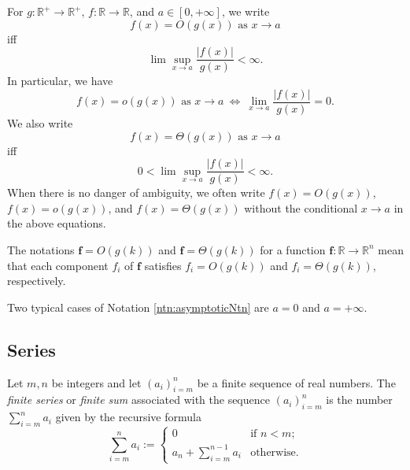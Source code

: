 \begin{ntn}
  \label{ntn:asymptoticNtn}
  For $g:\mathbb{R}^+\rightarrow\mathbb{R}^+$, 
  $f:\mathbb{R} \rightarrow\mathbb{R}$, 
  and $a\in [0,+\infty]$, 
  we write
  \begin{displaymath}
    f(x) = O(g(x)) \text{ as } x\to a %
  \end{displaymath}
  iff %
  \begin{displaymath}
    \lim\sup_{x\rightarrow a} \frac{|f(x)|}{g(x)} < \infty.
  \end{displaymath}
  In particular, we have
  \begin{displaymath}
    f(x) = o(g(x)) \text{ as } x\to a
    \ \Leftrightarrow\
    \lim_{x\rightarrow a} \frac{|f(x)|}{g(x)} = 0.
  \end{displaymath}
  We also write
  \begin{displaymath}
    f(x)=\Theta(g(x)) \text{ as } x\to a %
  \end{displaymath}
  iff
  \begin{displaymath}
    0< \lim\sup_{x\rightarrow a} \frac{|f(x)|}{g(x)} < \infty.
  \end{displaymath}
  When there is no danger of ambiguity,
  we often write $f(x)=O(g(x))$,
  $f(x)=o(g(x))$, and $f(x)=\Theta(g(x))$
  without the conditional $x \rightarrow a$
  in the above equations.

  The notations $\mathbf{f}=O(g(k))$ and $\mathbf{f}=\Theta(g(k))$
  for a function $\mathbf{f}:\mathbb{R} \rightarrow\mathbb{R}^n$
  mean that each component $f_i$ of $\mathbf{f}$
  satisfies ${f}_i=O(g(k))$ and ${f}_i=\Theta(g(k))$,
  respectively.
\end{ntn}

\begin{rem}
  Two typical cases of Notation \ref{ntn:asymptoticNtn}
  are $a=0$ and $a=+\infty$.
\end{rem}


\subsection{Series}
\label{sec:series}

\begin{defn}
  Let $m,n$ be integers
  and let $(a_i)_{i=m}^n$ be a finite sequence of real numbers.
  The \emph{finite series} or \emph{finite sum} associated with the sequence
  $(a_i)_{i=m}^n$ is the number $\sum_{i=m}^n a_i$
  given by the recursive formula
  \begin{equation}
    \label{eq:finiteSeries}
    \sum_{i=m}^n a_i :=
    \begin{cases}
      0 & \text{if } n< m;
      \\
      a_n + \sum_{i=m}^{n-1} a_i & \text{otherwise}.
    \end{cases}
  \end{equation}
\end{defn}

